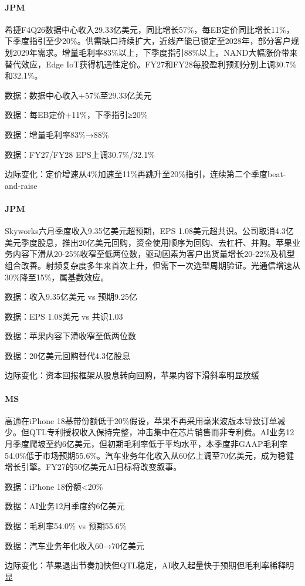 \documentclass[11pt]{ctexart}
\begin{document}
\paragraph{JPM} 希捷F4Q26数据中心收入29.33亿美元，同比增长57\%，每EB定价同比增长11\%，下季度指引至少20\%。供需缺口持续扩大，近线产能已锁定至2028年，部分客户规划2029年需求。增量毛利率83\%以上，下季度指引88\%以上。NAND大幅涨价带来替代效应，Edge IoT获得机遇性定价。FY27和FY28每股盈利预测分别上调30.7\%和32.1\%。
{\small\color{refgray}数据：数据中心收入+57\%至29.33亿美元\par}
{\small\color{refgray}数据：每EB定价+11\%，下季指引≥20\%\par}
{\small\color{refgray}数据：增量毛利率83\%→88\%\par}
{\small\color{refgray}数据：FY27/FY28 EPS上调30.7\%/32.1\%\par}
{\small\color{refgray}边际变化：定价增速从4\%加速至11\%再跳升至20\%指引，连续第二个季度beat-and-raise\par}
\paragraph{JPM} Skyworks六月季度收入9.35亿美元超预期，EPS 1.08美元超共识。公司取消4.3亿美元季度股息，推出20亿美元回购，资金使用顺序为回购、去杠杆、并购。苹果业务内容下滑从20-25\%收窄至低两位数，驱动因素为客户出货量增长20-22\%及机型组合改善。射频复杂度多年来首次上升，但需下一次选型周期验证。光通信增速从30\%降至15\%，属基数效应。
{\small\color{refgray}数据：收入9.35亿美元 vs 预期9.25亿\par}
{\small\color{refgray}数据：EPS 1.08美元 vs 共识1.03\par}
{\small\color{refgray}数据：苹果内容下滑收窄至低两位数\par}
{\small\color{refgray}数据：20亿美元回购替代4.3亿股息\par}
{\small\color{refgray}边际变化：资本回报框架从股息转向回购，苹果内容下滑斜率明显放缓\par}
\paragraph{MS} 高通在iPhone 18基带份额低于20\%假设，苹果不再采用毫米波版本导致订单减少。但QTL专利授权收入保持完整，冲击集中在芯片销售而非专利费。AI业务12月季度爬坡至约6亿美元，但初期毛利率低于平均水平，本季度非GAAP毛利率54.0\%低于市场预期55.6\%。汽车业务年化收入从60亿上调至70亿美元，成为稳健增长引擎。FY27的50亿美元AI目标将改变叙事。
{\small\color{refgray}数据：iPhone 18份额<20\%\par}
{\small\color{refgray}数据：AI业务12月季度约6亿美元\par}
{\small\color{refgray}数据：毛利率54.0\% vs 预期55.6\%\par}
{\small\color{refgray}数据：汽车业务年化收入60→70亿美元\par}
{\small\color{refgray}边际变化：苹果退出节奏加快但QTL稳定，AI收入起量快于预期但毛利率稀释明显\par}
\end{document}
